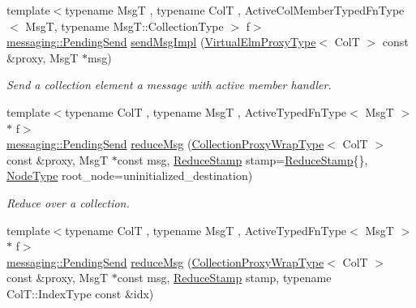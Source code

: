 \begin{DoxyCompactItemize}
{\footnotesize template$<$typename MsgT , typename ColT , Active\+Col\+Member\+Typed\+Fn\+Type$<$ Msg\+T, typename Msg\+T\+::\+Collection\+Type $>$ f$>$ }\\\hyperlink{structvt_1_1messaging_1_1_pending_send}{messaging\+::\+Pending\+Send} \hyperlink{structvt_1_1vrt_1_1collection_1_1_collection_manager_afc14691c6992cc5d7e51118b1386b67c}{send\+Msg\+Impl} (\hyperlink{namespacevt_1_1vrt_a620a5c8c59d13e513f690c74b4af516f}{Virtual\+Elm\+Proxy\+Type}$<$ ColT $>$ const \&proxy, MsgT $\ast$msg)
\begin{DoxyCompactList}\small\item\em Send a collection element a message with active member handler. \end{DoxyCompactList}\item 
{\footnotesize template$<$typename ColT , typename MsgT , Active\+Typed\+Fn\+Type$<$ Msg\+T $>$ $\ast$ f$>$ }\\\hyperlink{structvt_1_1messaging_1_1_pending_send}{messaging\+::\+Pending\+Send} \hyperlink{structvt_1_1vrt_1_1collection_1_1_collection_manager_a2ac056928e39edf125420e1113cde2bf}{reduce\+Msg} (\hyperlink{structvt_1_1vrt_1_1collection_1_1_collection_manager_a56458ed7f9bb22b631b9b3a745f42f94}{Collection\+Proxy\+Wrap\+Type}$<$ ColT $>$ const \&proxy, MsgT $\ast$const msg, \hyperlink{structvt_1_1vrt_1_1collection_1_1_collection_manager_ae8aac19e0ae07e9225142e5880eac830}{Reduce\+Stamp} stamp=\hyperlink{structvt_1_1vrt_1_1collection_1_1_collection_manager_ae8aac19e0ae07e9225142e5880eac830}{Reduce\+Stamp}\{\}, \hyperlink{namespacevt_a866da9d0efc19c0a1ce79e9e492f47e2}{Node\+Type} root\+\_\+node=uninitialized\+\_\+destination)
\begin{DoxyCompactList}\small\item\em Reduce over a collection. \end{DoxyCompactList}\item 
{\footnotesize template$<$typename ColT , typename MsgT , Active\+Typed\+Fn\+Type$<$ Msg\+T $>$ $\ast$ f$>$ }\\\hyperlink{structvt_1_1messaging_1_1_pending_send}{messaging\+::\+Pending\+Send} \hyperlink{structvt_1_1vrt_1_1collection_1_1_collection_manager_a47fe848e9c16d55bcefcbfeefa6b5597}{reduce\+Msg} (\hyperlink{structvt_1_1vrt_1_1collection_1_1_collection_manager_a56458ed7f9bb22b631b9b3a745f42f94}{Collection\+Proxy\+Wrap\+Type}$<$ ColT $>$ const \&proxy, MsgT $\ast$const msg, \hyperlink{structvt_1_1vrt_1_1collection_1_1_collection_manager_ae8aac19e0ae07e9225142e5880eac830}{Reduce\+Stamp} stamp, typename Col\+T\+::\+Index\+Type const \&idx)

\end{DoxyCompactItemize}
